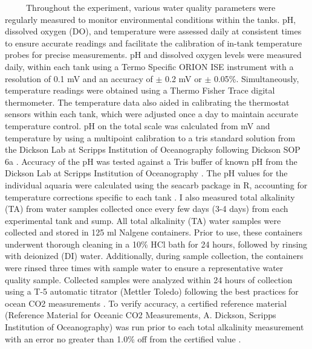 \documentclass[
  12pt,
]{article}
\begin{document}
~~~~~Throughout the experiment, various water quality parameters were
regularly measured to monitor environmental conditions within the tanks.
pH, dissolved oxygen (DO), and temperature were assessed daily at
consistent times to ensure accurate readings and facilitate the
calibration of in-tank temperature probes for precise measurements. pH
and dissolved oxygen levels were measured daily, within each tank using
a Termo Specific ORION ISE instrument with a resolution of 0.1 mV and an
accuracy of \(\pm\) 0.2 mV or \(\pm\) 0.05\%. Simultaneously,
temperature readings were obtained using a Thermo Fisher Trace digital
thermometer. The temperature data also aided in calibrating the
thermostat sensors within each tank, which were adjusted once a day to
maintain accurate temperature control. pH on the total scale was
calculated from mV and temperature by using a multipoint calibration to
a tris standard solution from the Dickson Lab at Scripps Institution of
Oceanography following Dickson SOP 6a \citep{dickson2007guide}. Accuracy
of the pH was tested against a Tris buffer of known pH from the Dickson
Lab at Scripps Institution of Oceanography \citep{dickson2007guide}. The
pH values for the individual aquaria were calculated using the seacarb
package in R, accounting for temperature corrections specific to each
tank \citep{gattuso2015package}. I also measured total alkalinity (TA)
from water samples collected once every few days (3-4 days) from each
experimental tank and sump. All total alkalinity (TA) water samples were
collected and stored in 125 ml Nalgene containers. Prior to use, these
containers underwent thorough cleaning in a 10\% HCl bath for 24 hours,
followed by rinsing with deionized (DI) water. Additionally, during
sample collection, the containers were rinsed three times with sample
water to ensure a representative water quality sample. Collected samples
were analyzed within 24 hours of collection using a T-5 automatic
titrator (Mettler Toledo) following the best practices for ocean CO2
measurements \citep{dickson2007guide}. To verify accuracy, a certified
reference material (Reference Material for Oceanic CO2 Measurements, A.
Dickson, Scripps Institution of Oceanography) was run prior to each
total alkalinity measurement with an error no greater than 1.0\% off
from the certified value \citep{dickson2007guide}.
\end{document}
